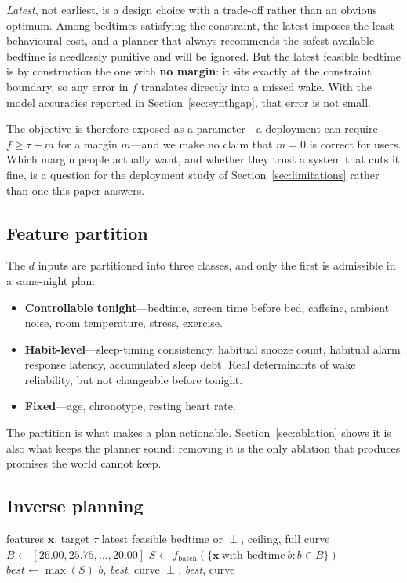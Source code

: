 \documentclass[conference]{IEEEtran}
\begin{document}
\emph{Latest}, not earliest, is a design choice with a trade-off rather than an
obvious optimum. Among bedtimes satisfying the constraint, the latest imposes
the least behavioural cost, and a planner that always recommends the safest
available bedtime is needlessly punitive and will be ignored. But the latest
feasible bedtime is by construction the one with \textbf{no margin}: it sits
exactly at the constraint boundary, so any error in $f$ translates directly into
a missed wake. With the model accuracies reported in
Section~\ref{sec:synthgap}, that error is not small.

The objective is therefore exposed as a parameter---a deployment can require
$f \ge \tau + m$ for a margin $m$---and we make no claim that $m = 0$ is correct
for users. Which margin people actually want, and whether they trust a system
that cuts it fine, is a question for the deployment study of
Section~\ref{sec:limitations} rather than one this paper answers.

\subsection{Feature partition}

The $d$ inputs are partitioned into three classes, and only the first is
admissible in a same-night plan:

\begin{itemize}
\item \textbf{Controllable tonight}---bedtime, screen time before bed, caffeine,
      ambient noise, room temperature, stress, exercise.
\item \textbf{Habit-level}---sleep-timing consistency, habitual snooze count,
      habitual alarm response latency, accumulated sleep debt. Real determinants
      of wake reliability, but not changeable before tonight.
\item \textbf{Fixed}---age, chronotype, resting heart rate.
\end{itemize}

The partition is what makes a plan actionable. Section~\ref{sec:ablation} shows
it is also what keeps the planner sound: removing it is the only ablation that
produces promises the world cannot keep.

\subsection{Inverse planning}

\begin{algorithm}[t]
\caption{Bedtime sweep}
\label{alg:sweep}
\begin{algorithmic}[1]
\Require features $\mathbf{x}$, target $\tau$
\Ensure latest feasible bedtime or $\perp$, ceiling, full curve
\State $B \gets [26.00, 25.75, \dots, 20.00]$ 
\State $S \gets f_{\text{batch}}(\{\mathbf{x}\ \text{with bedtime}\ b : b \in B\})$
\State $\textit{best} \gets \max(S)$
   \Return $b$, \textit{best}, curve 
  \EndIf
\EndFor
\State \Return $\perp$, \textit{best}, curve
\end{algorithmic}
\end{algorithm}
\end{document}

